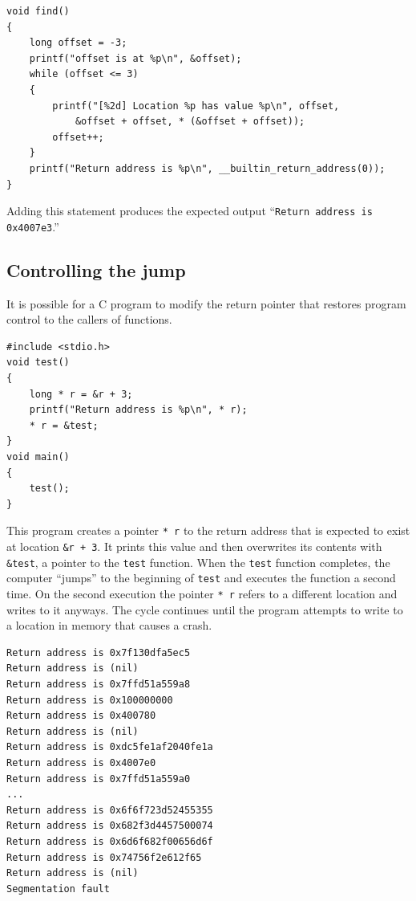 \documentclass{book}
\begin{document}
\begin{lstlisting}[caption={todo}, captionpos=b, mathescape, xleftmargin=.25in, xrightmargin=.25in]
void find()
{
    long offset = -3;
    printf("offset is at %p\n", &offset);
    while (offset <= 3)
    {
        printf("[%2d] Location %p has value %p\n", offset,
            &offset + offset, * (&offset + offset));
        offset++;
    }
    printf("Return address is %p\n", __builtin_return_address(0));
}
\end{lstlisting}

Adding this statement produces the expected output ``\texttt{Return address is 0x4007e3}.''

\subsection{Controlling the jump}

It is possible for a C program to modify the return pointer that restores program control to the callers of functions.

\begin{lstlisting}[caption={todo}, captionpos=b, mathescape, xleftmargin=.25in, xrightmargin=.25in]
#include <stdio.h>
void test()
{
    long * r = &r + 3;
    printf("Return address is %p\n", * r);
    * r = &test;
}
void main()
{
    test();
}
\end{lstlisting}

This program creates a pointer \texttt{* r} to the return address that is expected to exist at location \texttt{\&r + 3}. It prints this value and then overwrites its contents with \texttt{\&test}, a pointer to the \texttt{test} function. When the \texttt{test} function completes, the computer ``jumps'' to the beginning of \texttt{test} and executes the function a second time. On the second execution the pointer \texttt{* r} refers to a different location and writes to it anyways. The cycle continues until the program attempts to write to a location in memory that causes a crash.

\begin{lstlisting}[caption={todo}, captionpos=b, mathescape, xleftmargin=.25in, xrightmargin=.25in]
Return address is 0x7f130dfa5ec5         
Return address is (nil)
Return address is 0x7ffd51a559a8     
Return address is 0x100000000   
Return address is 0x400780     
Return address is (nil)
Return address is 0xdc5fe1af2040fe1a
Return address is 0x4007e0
Return address is 0x7ffd51a559a0
...
Return address is 0x6f6f723d52455355
Return address is 0x682f3d4457500074
Return address is 0x6d6f682f00656d6f
Return address is 0x74756f2e612f65     
Return address is (nil)             
Segmentation fault
\end{lstlisting}
\end{document}

